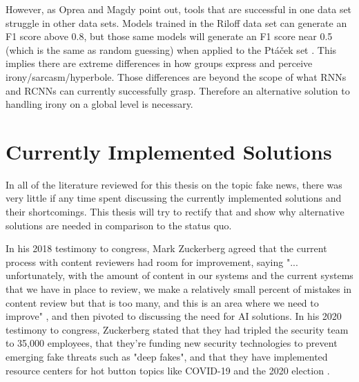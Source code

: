 \documentclass[NETN,manuscript]{stjour-new}
\begin{document}
However, as Oprea and Magdy point out, tools that are successful in one data set struggle in other data sets. Models trained in the Riloff data set can generate an F1 score above 0.8, but those same models will generate an F1 score near 0.5 (which is the same as random guessing) when applied to the Pt{\'a}{\v{c}}ek set \citep{oprea2019exploring}. This implies there are extreme differences in how groups express and perceive irony/sarcasm/hyperbole. Those differences are beyond the scope of what RNNs and RCNNs can currently successfully grasp. Therefore an alternative solution to handling irony on a global level is necessary.

\section{Currently Implemented Solutions}
In all of the literature reviewed for this thesis on the topic fake news, there was very little if any time spent discussing the currently implemented solutions and their shortcomings. This thesis will try to rectify that and show why alternative solutions are needed in comparison to the status quo.

In his 2018 testimony to congress, Mark Zuckerberg agreed that the current process with content reviewers had room for improvement, saying "... unfortunately, with the amount of content in our systems and the current systems that we have in place to review, we make a relatively small percent of mistakes in content review but that is too many, and this is an area where we need to improve" \citep{energy2018facebook}, and then pivoted to discussing the need for AI solutions. In his 2020 testimony to congress, Zuckerberg stated that they had tripled the security team to 35,000 employees, that they're funding new security technologies to prevent emerging fake threats such as "deep fakes", and that they have implemented resource centers for hot button topics like COVID-19 and the 2020 election \citep{zuckerberg2020}.
\end{document}
